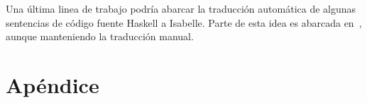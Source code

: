 \documentclass[12pt]{book}
\begin{document}
Una última linea de trabajo podría abarcar la traducción automática de algunas sentencias de código fuente Haskell a Isabelle. Parte de esta idea es abarcada en~\cite{translating-haskell-to-isabelle}, aunque manteniendo la traducción manual.



\chapter{Apéndice}





\end{document}
